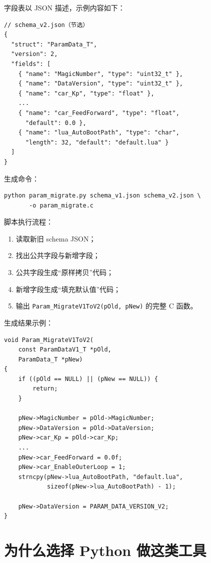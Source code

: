 字段表以 JSON 描述，示例内容如下：

\begin{lstlisting}
// schema_v2.json（节选）
{
  "struct": "ParamData_T",
  "version": 2,
  "fields": [
    { "name": "MagicNumber", "type": "uint32_t" },
    { "name": "DataVersion", "type": "uint32_t" },
    { "name": "car_Kp", "type": "float" },
    ...
    { "name": "car_FeedForward", "type": "float",
      "default": 0.0 },
    { "name": "lua_AutoBootPath", "type": "char",
      "length": 32, "default": "default.lua" }
  ]
}
\end{lstlisting}

生成命令：

\begin{lstlisting}
python param_migrate.py schema_v1.json schema_v2.json \
       -o param_migrate.c
\end{lstlisting}

脚本执行流程：

\begin{enumerate}
\item 读取新旧 schema JSON；
\item 找出公共字段与新增字段；
\item 公共字段生成“原样拷贝”代码；
\item 新增字段生成“填充默认值”代码；
\item 输出 \texttt{Param\_MigrateV1ToV2(pOld, pNew)} 的完整 C 函数。
\end{enumerate}

生成结果示例：

\begin{lstlisting}[style=c]
void Param_MigrateV1ToV2(
    const ParamDataV1_T *pOld,
    ParamData_T *pNew)
{
    if ((pOld == NULL) || (pNew == NULL)) {
        return;
    }

    pNew->MagicNumber = pOld->MagicNumber;
    pNew->DataVersion = pOld->DataVersion;
    pNew->car_Kp = pOld->car_Kp;
    ...
    pNew->car_FeedForward = 0.0f;
    pNew->car_EnableOuterLoop = 1;
    strncpy(pNew->lua_AutoBootPath, "default.lua",
            sizeof(pNew->lua_AutoBootPath) - 1);

    pNew->DataVersion = PARAM_DATA_VERSION_V2;
}
\end{lstlisting}

\section{为什么选择 Python 做这类工具}

